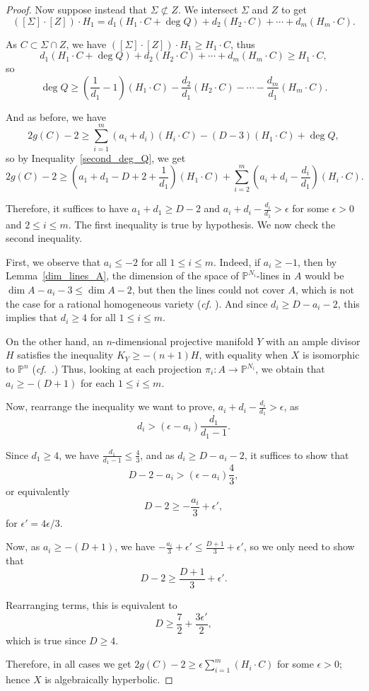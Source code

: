 \documentclass[11pt]{amsart}
\numberwithin{equation}{section}
\theoremstyle{definition}
\theoremstyle{remark}
\renewcommand{\P}{\mathbb{P}}
\begin{document}
\begin{proof}
Now suppose  instead that $\Sigma \not \subset Z$. We intersect $\Sigma$ and $Z$ to get
\[ ([\Sigma]\cdot [Z])\cdot H_1 = d_1(H_1\cdot C + \deg Q) + d_2(H_2\cdot C) + \cdots + d_m(H_m\cdot C). \]

As $C\subset \Sigma \cap Z$, we have $([\Sigma]\cdot [Z])\cdot H_1\ge H_1\cdot C$, thus
\[ d_1(H_1\cdot C + \deg Q) + d_2(H_2\cdot C) + \cdots + d_m(H_m\cdot C)\ge H_1\cdot C, \]
so
\begin{equation}\label{second_deg_Q}
    \deg Q\ge \left (\frac{1}{d_1}-1\right )(H_1\cdot C) - \frac{d_2}{d_1}(H_2\cdot C) - \cdots - \frac{d_m}{d_1}(H_m\cdot C).
\end{equation}

And as before, we have
\[ 2g(C) - 2\ge \sum_{i=1}^m(a_i+d_i)(H_i\cdot C) - (D-3)(H_1\cdot C) + \deg Q, \]
so by Inequality~\eqref{second_deg_Q}, we get
\[ 2g(C)-2\ge \left (a_1+d_1-D+2+\frac{1}{d_1}\right )(H_1\cdot C) + \sum_{i=2}^m\left (a_i+d_i-\frac{d_i}{d_1}\right )(H_i\cdot C). \]

Therefore, it suffices to have $a_1+d_1\ge D-2$ and $a_i+d_i-\frac{d_i}{d_1}>\epsilon$ for some $\epsilon > 0$ and $2\le i\le m$. The first inequality is true by hypothesis. We now check the second inequality.

First, we observe that $a_i\le -2$ for all $1\le i\le m$. Indeed, if $a_i\ge -1$, then by Lemma~\ref{dim_lines_A}, the dimension of the space of $\P^{N_i}$-lines in $A$ would be $\dim A-a_i-3\le \dim A-2$, but then the lines could not cover $A$, which is not the case for a rational homogeneous variety (\textit{cf.} \cite[Theorem 1.5 and the following paragraph]{Man20}). And since $d_i\ge D-a_i-2$, this implies that $d_i\ge 4$ for all $1\le i\le m$.

On the other hand, an $n$-dimensional projective manifold $Y$ with an ample divisor $H$ satisfies the inequality $K_Y \ge -(n+1)H$, with equality when $X$ is isomorphic to $\P^n$ (\textit{cf.}~\cite{KO73}.) Thus, looking at each projection $\pi_i\colon A\to \P^{N_i}$, we obtain that $a_i \ge -(D+1)$ for each $1\le i\le m$.

Now, rearrange the inequality we want to prove, $a_i+d_i-\frac{d_i}{d_1}>\epsilon$, as 
\[ d_i > (\epsilon - a_i)\frac{d_1}{d_1-1}. \]

Since $d_1\ge 4$, we have $\frac{d_1}{d_1-1}\le \frac{4}{3}$, and as $d_i\ge D-a_i-2$, it suffices to show that
\[ D-2-a_i > (\epsilon - a_i)\frac{4}{3}, \]
or equivalently
\[ D-2\ge -\frac{a_i}{3} + \epsilon ', \]
for $\epsilon ' = 4\epsilon /3$.

Now, as $a_i\ge -(D+1)$, we have $-\frac{a_i}{3} + \epsilon '\le \frac{D+1}{3} + \epsilon '$, so we only need to show that
\[ D-2\ge \frac{D+1}{3} + \epsilon '. \]

Rearranging terms, this is equivalent to
\[ D\ge \frac{7}{2} + \frac{3\epsilon '}{2}, \]
which is true since $D\ge 4$.

Therefore, in all cases we get $2g(C)-2\ge \epsilon \sum_{i=1}^m(H_i\cdot C)$ for some $\epsilon > 0$; hence $X$ is algebraically hyperbolic.
\end{proof}
\end{document}
